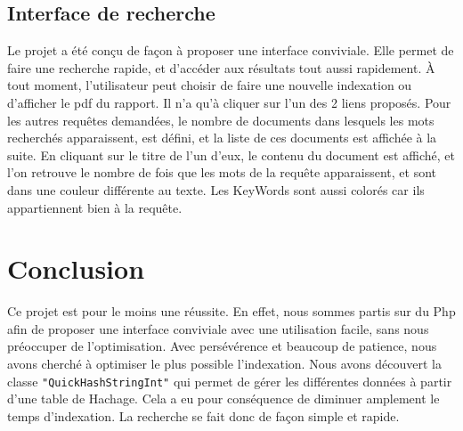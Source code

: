 \documentclass[11pt,a4paper]{article}
\begin{document}
\newpage

\subsection{Interface de recherche}

Le projet a été conçu de façon à proposer une interface conviviale. Elle permet de faire une recherche rapide, et d'accéder aux résultats tout aussi rapidement.
À tout moment, l'utilisateur peut choisir de faire une nouvelle indexation ou d'afficher le pdf du rapport. Il n'a qu'à cliquer sur l'un des 2 liens proposés. 
Pour les autres requêtes demandées, le nombre de documents dans lesquels les mots recherchés apparaissent, est défini, et la liste de ces documents est affichée à la suite.
\medbreak
En cliquant sur le titre de l'un d'eux, le contenu du document est affiché, et l'on retrouve le nombre de fois que les mots de la requête apparaissent, et sont dans une couleur différente
au texte. Les KeyWords sont aussi colorés car ils appartiennent bien à la requête.

\section{Conclusion}
Ce projet est pour le moins une réussite. En effet, nous sommes partis sur du Php afin de proposer une interface conviviale avec une utilisation facile, sans nous préoccuper de l'optimisation.
Avec persévérence et beaucoup de patience, nous avons cherché à optimiser le plus possible l'indexation. Nous avons découvert la classe \verb|"QuickHashStringInt"| qui permet de gérer les différentes données à partir d'une table de Hachage.
Cela a eu pour conséquence de diminuer amplement le temps d'indexation. La recherche se fait donc de façon simple et rapide.
\end{document}
